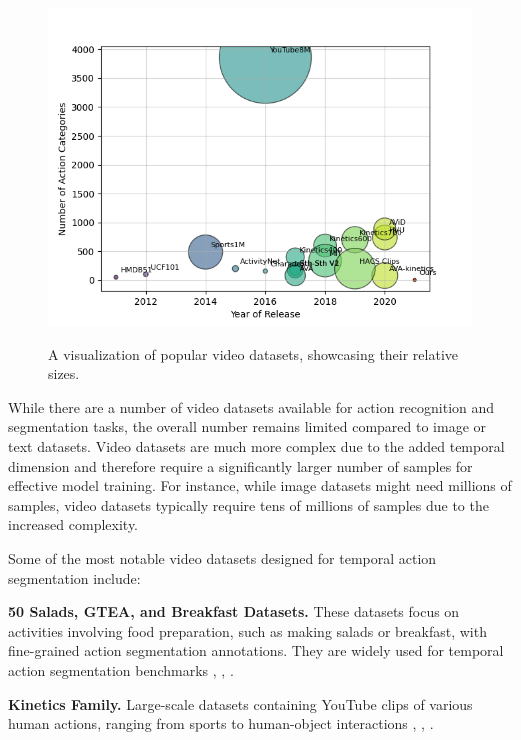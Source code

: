 \begin{figure}[h!]
    \centering
    \includegraphics[width=1\linewidth]{../../assets/figures/popular-datasets.png}
    \caption{A visualization of popular video datasets, showcasing their relative sizes.}
    \label{figure:popular-datasets-visualization}
    \cite{video-action-recognition-study}
\end{figure}

While there are a number of video datasets available for action recognition and segmentation tasks, the overall number remains limited compared to image or text datasets. Video datasets are much more complex due to the added temporal dimension and therefore require a significantly larger number of samples for effective model training. For instance, while image datasets might need millions of samples, video datasets typically require tens of millions of samples due to the increased complexity.

Some of the most notable video datasets designed for temporal action segmentation include:

\noindent\textbf{50 Salads, GTEA, and Breakfast Datasets.} These datasets focus on activities involving food preparation, such as making salads or breakfast, with fine-grained action segmentation annotations. They are widely used for temporal action segmentation benchmarks \cite{50-salads-dataset}, \cite{gtea-dataset}, \cite{breakfasts-dataset}.

\noindent\textbf{Kinetics Family.} Large-scale datasets containing YouTube clips of various human actions, ranging from sports to human-object interactions \cite{kinetics-400-dataset}, \cite{kinetics-600-dataset}, \cite{kinetics-700-dataset}.

